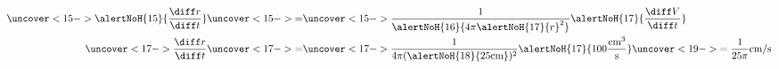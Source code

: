 \begin{frame}
\begin{example}
\begin{columns}[c]
\begin{align*}
\uncover<15->{%
\alertNoH{15}{\frac{\diff r}{\diff t}}%
}%
& \uncover<15->{ = } %
\uncover<15->{%
\frac{1}{\alertNoH{16}{ 4\pi \alertNoH{ 17}{r}^2}}\alertNoH{ 17}{\frac{\diff V}{\diff t}}%
}\\%
\uncover<17->{%
\frac{\diff r}{\diff t}%
}%
& \uncover<17->{ = } %
\uncover<17->{%
\frac{1}{4\pi (\alertNoH{ 18}{25 \text{cm}})^2}\alertNoH{ 17}{100 \frac{\text{cm}^3}{\text{s}}} \uncover<19->{ = \frac{1}{25\pi}\text{cm}/\text{s}}%
}%
\end{align*}
\end{columns}
\end{example}
\end{frame}
